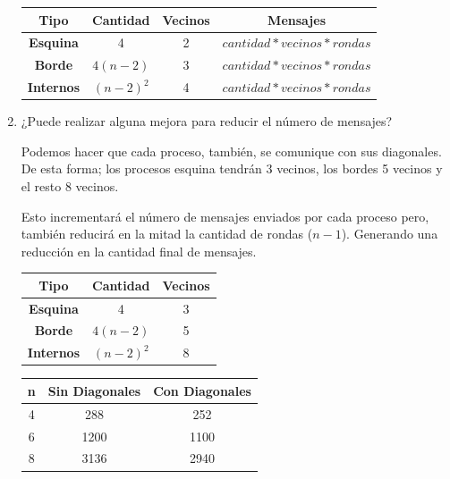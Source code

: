 \documentclass[a4paper, 10pt]{article}
\newenvironment{QandA}{
    \begin{enumerate}\bfseries}
    {\end{enumerate}
}
\newenvironment{answered}{\par\normalfont}{}
\begin{document}
\begin{QandA}
\begin{enumerate}
\begin{answered}
{\renewcommand{\arraystretch}{2}%
\begin{center}
\begin{tabular}{c c c c}
\textbf{Tipo} &  \textbf{Cantidad} & \textbf{Vecinos} & \textbf{Mensajes} \\
\hline
\textbf{Esquina} & 4 & 2 & $cantidad * vecinos * rondas$ \\
\hline
\textbf{Borde} & $4(n-2)$ & 3 & $cantidad * vecinos * rondas$ \\
\hline
\textbf{Internos} & $(n-2)^2$ & 4 & $cantidad * vecinos * rondas$\\
\end{tabular}
\end{center}}
\end{answered}

\item ¿Puede realizar alguna mejora para reducir el número de mensajes?
\begin{answered}
Podemos hacer que cada proceso, también, se comunique con sus diagonales. De esta forma; los procesos esquina tendrán 3 vecinos, los bordes 5 vecinos y el resto 8 vecinos.

Esto incrementará el número de mensajes enviados por cada proceso pero, también reducirá en la mitad la cantidad de rondas ($n-1$). Generando una reducción en la cantidad final de mensajes.

\begin{multicols}{2}
{\renewcommand{\arraystretch}{2}%
\begin{center}
\begin{tabular}{c c c}
\textbf{Tipo} &  \textbf{Cantidad} & \textbf{Vecinos} \\
\hline
\textbf{Esquina} & 4 & 3 \\
\hline
\textbf{Borde} & $4(n-2)$ & 5 \\
\hline
\textbf{Internos} & $(n-2)^2$ & 8 \\
\end{tabular}
\end{center}}  
\columnbreak
{\renewcommand{\arraystretch}{2}%
\begin{center}
\begin{tabular}{c c c}
\textbf{n} &  \textbf{Sin Diagonales} & \textbf{Con Diagonales} \\
\hline
4 & 288 & 252\\
\hline
6 & 1200 &  1100\\
\hline
8 & 3136 &  2940\\
\end{tabular}
\end{center}}  
\end{multicols}


\end{answered}
\end{enumerate}
\end{QandA}
\end{document}
